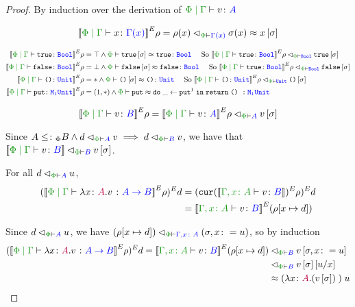 \documentclass{Report}
\newcommand\eLogRel[4]{\logRel{#2}{\wellformed{#1}{#3}}{#4}}
\newcommand\peLogRel[3]{\eLogRel{\P}{#1}{#2}{#3}}
\newcommand{\zpberelation}[2]{\berelation{\P}{#1}{#2}}
\newcommand{\fapply}[0]{^E}
\begin{document}
\begin{proof}
    By induction over the derivation of $\gpetyperelation{v}{A}$

    \begin{equation}
        \deno{\gpetyperelation{x}{\G(x)}}\fapply\rho = \peLogRel{\rho(x)}{\G(x)}{\si(x)}\beequiv x\ssi
    \end{equation}

    \begin{align*}
        \deno{\gpetyperelation{\t}{\B}}\fapply\rho & = \top \wedge \zpberelation{\t\ssi}{\t}{\B} \qt{ So } \peLogRel{\deno{\gpetyperelation{\t}{\B}}\fapply\rho}{\B}{\t\ssi}\\
        \deno{\gpetyperelation{\f}{\B}}\fapply\rho & = \bot \wedge \zpberelation{\f\ssi}{\f}{\B} \qt{ So } \peLogRel{\deno{\gpetyperelation{\t}{\B}}\fapply\rho}{\B}{\f\ssi}\\
        \deno{\gpetyperelation{\u}{\U}}\fapply\rho & = \singleton \wedge \zpberelation{\u\ssi}{\u}{\U} \qt{ So } \peLogRel{\deno{\gpetyperelation{\u}{\U}}\fapply\rho}{\U}{\u\ssi}\\
        \deno{\gpetyperelation{\put}{\M{1}{\U}}}\fapply\rho & = (1, \singleton)\wedge \zpberelation{\put}{\doin{\_}{\put^1}{\return{\u}}}{\M{1}{\U}}\\ 
    \end{align*}


    \case{\vsubtype}

    \begin{equation}
        \deno{\gpetyperelation{v}{B}}\fapply\rho = \peLogRel{\deno{\gpetyperelation{v}{A}}\fapply\rho}{A}{v\ssi}
    \end{equation}

    Since $A\subtypep B \wedge \peLogRel{d}{A}{v} \implies \peLogRel{d}{B}{v}$, we have that $\peLogRel{\deno{\gpetyperelation{v}{B}}}{B}{v\ssi}$.

    \case{\vfun}

    For all $\peLogRel{d}{A}{u}$, 
    \begin{align*}
        (\deno{\gpetyperelation{\lam{x}{A}{v}}{\ab}}\fapply\rho)\fapply d & = (\cur{\deno{\typerelation{\gax}{v}{B}}}\fapply\rho)\fapply d\\
        & = \deno{\typerelation{\gax}{v}{B}}\fapply (\rho[x\mapsto d])\\
    \end{align*}

    Since $\peLogRel{d}{A}{u}$, we have $\peLogRel{(\rho[x\mapsto d])}{\gax}{(\si, x\setto u)}$, so by induction
    \begin{align*}
        (\deno{\gpetyperelation{\lam{x}{A}{v}}{\ab}}\fapply\rho)\fapply d = \peLogRel{\deno{\typerelation{\gax}{v}{B}}\fapply(\rho[x\mapsto d])&}{B}{v\sub{\si, x\setto u}}
        \\
        \peLogRel{&}{B}{v\ssi\ssub{x}{u}}\\
        & \beequiv \apply{(\lam{x}{A}{(v\ssi)})}{u}
    \end{align*}
\end{proof}
\end{document}
